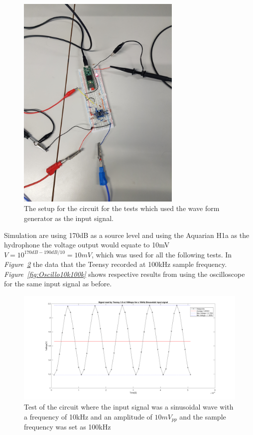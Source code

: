 \begin{figure}[h]
    \centering
    \includegraphics[width=0.7\textwidth]{graphics/TestSetup.jpg}
    \caption{The setup for the circuit for the tests which used the wave form generator as the input signal.}
    \label{fig:testCircSetup}
\end{figure}

Simulation are using 170dB as a source level and using the Aquarian H1a as the hydrophone the voltage output would equate to 10mV $V = 10^{170dB-190dB/10} = 10mV$, which was used for all the following tests.
In \textit{Figure~\ref{fig:Teensy10k100k}} the data that the Teensy recorded at 100kHz sample frequency.
\textit{Figure~\ref{fig:Oscillo10k100k}} shows respective results from using the oscilloscope for the same input signal as before.

\begin{figure}[h]
    \centering
    \includegraphics[width=1.0\textwidth]{graphics/10kin_100ksampl.png}
    \caption{Test of the circuit where the input signal was a sinusoidal wave with a frequency of 10kHz and an amplitude of $10mV_{pp}$ and the sample frequency was set as 100kHz}
    \label{fig:Teensy10k100k}
\end{figure}


